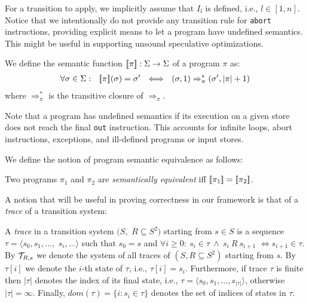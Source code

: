 \noindent For a transition to apply, we implicitly assume that $I_l$ is defined, i.e., $l\in[1,n]$. 
\ifx\noauthorea\undefined
Notice that we intentionally do not provide any transition rule for {\tt abort} instructions, providing explicit means to let a program have undefined semantics. This might be useful in supporting unsound speculative optimizations.
\fi

\begin{definition}
\label{de:program-semantics}
We define the semantic function $[\![\pi]\!]:\Sigma \rightarrow \Sigma$ of a program $\pi$ as: 
\begin{gather*}
\forall \sigma\in\Sigma: ~~ \mysem{\pi}(\sigma)=\sigma'~~%
\Longleftrightarrow ~~ (\sigma,1) \Rightarrow^{*}_{\pi} (\sigma',|\pi|+1)
\end{gather*}
where $\Rightarrow^{*}_{\pi}$ is the transitive closure of $\Rightarrow_{\pi}$.
\end{definition}

\noindent Note that a program has undefined semantics if its execution on a given store does not reach the final \texttt{out} instruction. This accounts for infinite loops, abort instructions, exceptions, and ill-defined programs or input stores. 

We define the notion of program semantic equivalence as follows:

\begin{definition}
\label{de:semantic-equivalence}
Two programs $\pi_1$ and $\pi_2$ are {\em semantically equivalent} iff $[\![\pi_1]\!]=[\![\pi_2]\!]$.
\end{definition}

\noindent A notion that will be useful in proving correctness in our framework is that of a {\em trace} of a transition system:

\begin{definition}[Traces]
\label{de:exec-trace}
A {\em trace} in a transition system $(S,$ $R\subseteq S^2)$ starting from $s\in S$ is a sequence $\tau=\langle s_0,s_1,\ldots,$ $s_i,\ldots\rangle$ such that $s_0=s$ and $\forall i\ge 0:~s_i\in\tau ~ \wedge ~ s_i~R~s_{i+1}$ $\Longleftrightarrow s_{i+1}\in\tau$. By ${\cal T}_{R,s}$ we denote the system of all traces of $(S,R\subseteq S^2)$ starting from $s$. By $\tau[i]$ we denote the $i$-th state of $\tau$, i.e., $\tau[i]=s_i$. Furthermore, if trace $\tau$ is finite then $|\tau|$ denotes the index of its final state, i.e., $\tau=\langle s_0,s_1,\ldots,s_{|\tau|}\rangle$, otherwise $|\tau|=\infty$. Finally, $dom(\tau)=\{i:s_i\in\tau\}$ denotes the set of indices of states in $\tau$.
\end{definition}


